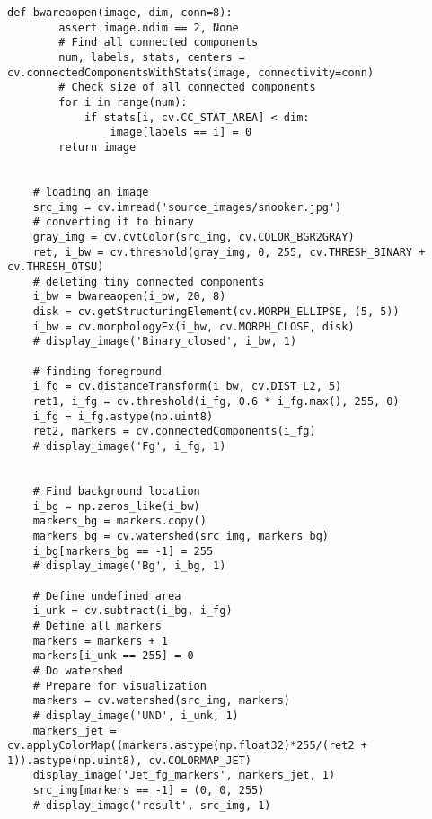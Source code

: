\begin{lstlisting}[caption={Исходный код программы для сегментации изображения}, label={lst:separation}]
    def bwareaopen(image, dim, conn=8):
        assert image.ndim == 2, None
        # Find all connected components
        num, labels, stats, centers = cv.connectedComponentsWithStats(image, connectivity=conn)
        # Check size of all connected components
        for i in range(num):
            if stats[i, cv.CC_STAT_AREA] < dim:
                image[labels == i] = 0
        return image


    # loading an image
    src_img = cv.imread('source_images/snooker.jpg')
    # converting it to binary
    gray_img = cv.cvtColor(src_img, cv.COLOR_BGR2GRAY)
    ret, i_bw = cv.threshold(gray_img, 0, 255, cv.THRESH_BINARY + cv.THRESH_OTSU)
    # deleting tiny connected components
    i_bw = bwareaopen(i_bw, 20, 8)
    disk = cv.getStructuringElement(cv.MORPH_ELLIPSE, (5, 5))
    i_bw = cv.morphologyEx(i_bw, cv.MORPH_CLOSE, disk)
    # display_image('Binary_closed', i_bw, 1)

    # finding foreground
    i_fg = cv.distanceTransform(i_bw, cv.DIST_L2, 5)
    ret1, i_fg = cv.threshold(i_fg, 0.6 * i_fg.max(), 255, 0)
    i_fg = i_fg.astype(np.uint8)
    ret2, markers = cv.connectedComponents(i_fg)
    # display_image('Fg', i_fg, 1)


    # Find background location
    i_bg = np.zeros_like(i_bw)
    markers_bg = markers.copy()
    markers_bg = cv.watershed(src_img, markers_bg)
    i_bg[markers_bg == -1] = 255
    # display_image('Bg', i_bg, 1)

    # Define undefined area
    i_unk = cv.subtract(i_bg, i_fg)
    # Define all markers
    markers = markers + 1
    markers[i_unk == 255] = 0
    # Do watershed
    # Prepare for visualization
    markers = cv.watershed(src_img, markers)
    # display_image('UND', i_unk, 1)
    markers_jet = cv.applyColorMap((markers.astype(np.float32)*255/(ret2 + 1)).astype(np.uint8), cv.COLORMAP_JET)
    display_image('Jet_fg_markers', markers_jet, 1)
    src_img[markers == -1] = (0, 0, 255)
    # display_image('result', src_img, 1)
\end{lstlisting}